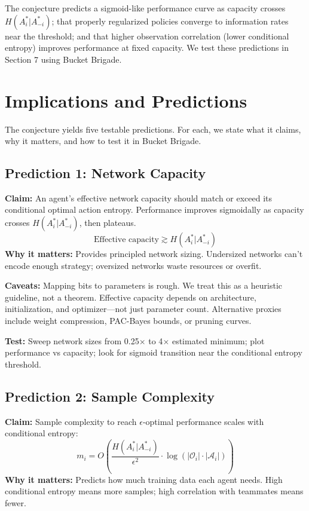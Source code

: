 \documentclass[10pt, letterpaper]{article}
\begin{document}
The conjecture predicts a sigmoid-like performance curve as capacity crosses $H(A_i^*|A_{-i}^*)$; that properly regularized policies converge to information rates near the threshold; and that higher observation correlation (lower conditional entropy) improves performance at fixed capacity. We test these predictions in Section 7 using Bucket Brigade.

\section{Implications and Predictions}
\label{sec:implications}

The conjecture yields five testable predictions. For each, we state what it claims, why it matters, and how to test it in Bucket Brigade.

\subsection{Prediction 1: Network Capacity}

\textbf{Claim:} An agent's effective network capacity should match or exceed its conditional optimal action entropy. Performance improves sigmoidally as capacity crosses $H(A_i^*|A_{-i}^*)$, then plateaus.
\[\text{Effective capacity} \gtrsim H(A_i^*|A_{-i}^*)\]
\textbf{Why it matters:} Provides principled network sizing. Undersized networks can't encode enough strategy; oversized networks waste resources or overfit.

\textbf{Caveats:} Mapping bits to parameters is rough. We treat this as a heuristic guideline, not a theorem. Effective capacity depends on architecture, initialization, and optimizer---not just parameter count. Alternative proxies include weight compression, PAC-Bayes bounds, or pruning curves.

\textbf{Test:} Sweep network sizes from 0.25$\times$ to 4$\times$ estimated minimum; plot performance vs capacity; look for sigmoid transition near the conditional entropy threshold.

\subsection{Prediction 2: Sample Complexity}

\textbf{Claim:} Sample complexity to reach $\epsilon$-optimal performance scales with conditional entropy:
\[m_i = O\left(\frac{H(A_i^*|A_{-i}^*)}{\epsilon^2} \cdot \log(|\mathcal{O}_i| \cdot |\mathcal{A}_i|)\right)\]
\textbf{Why it matters:} Predicts how much training data each agent needs. High conditional entropy means more samples; high correlation with teammates means fewer.
\end{document}
